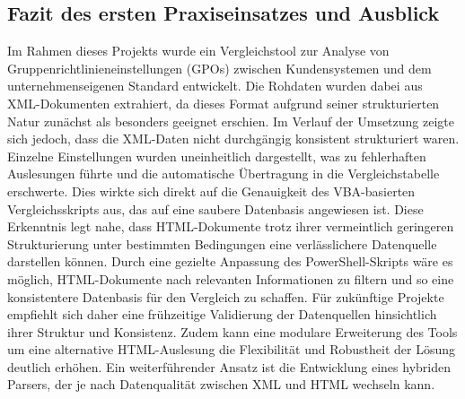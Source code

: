 \subsection{Fazit des ersten Praxiseinsatzes und Ausblick}
Im Rahmen dieses Projekts wurde ein Vergleichstool zur Analyse von Gruppenrichtlinieneinstellungen (GPOs) zwischen Kundensystemen und dem unternehmenseigenen Standard entwickelt. Die Rohdaten wurden dabei aus XML-Dokumenten extrahiert, da dieses Format aufgrund seiner strukturierten Natur zunächst als besonders geeignet erschien.\newline
Im Verlauf der Umsetzung zeigte sich jedoch, dass die XML-Daten nicht durchgängig konsistent strukturiert waren. Einzelne Einstellungen wurden uneinheitlich dargestellt, was zu fehlerhaften Auslesungen führte und die automatische Übertragung in die Vergleichstabelle erschwerte. Dies wirkte sich direkt auf die Genauigkeit des VBA-basierten Vergleichsskripts aus, das auf eine saubere Datenbasis angewiesen ist.\newline 
Diese Erkenntnis legt nahe, dass HTML-Dokumente trotz ihrer vermeintlich geringeren Strukturierung unter bestimmten Bedingungen eine verlässlichere Datenquelle darstellen können. Durch eine gezielte Anpassung des PowerShell-Skripts wäre es möglich, HTML-Dokumente nach relevanten Informationen zu filtern und so eine konsistentere Datenbasis für den Vergleich zu schaffen.\newline
Für zukünftige Projekte empfiehlt sich daher eine frühzeitige Validierung der Datenquellen hinsichtlich ihrer Struktur und Konsistenz. Zudem kann eine modulare Erweiterung des Tools um eine alternative HTML-Auslesung die Flexibilität und Robustheit der Lösung deutlich erhöhen. Ein weiterführender Ansatz ist die Entwicklung eines hybriden Parsers, der je nach Datenqualität zwischen XML und HTML wechseln kann.
